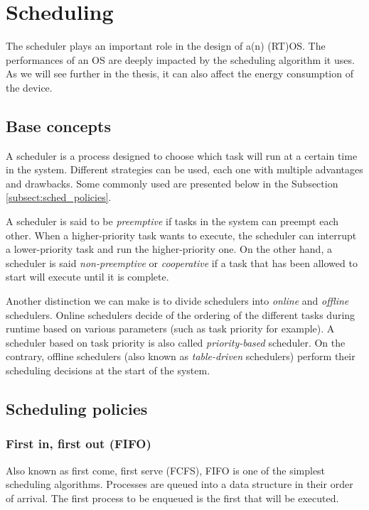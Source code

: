 \section{Scheduling}

The scheduler plays an important role in the design of a(n) (RT)OS.
The performances of an OS are deeply impacted by the scheduling algorithm it uses.
As we will see further in the thesis, it can also affect the energy consumption of the device.\\

\subsection{Base concepts}

A scheduler is a process designed to choose which task will run at a certain time in the system.
Different strategies can be used, each one with multiple advantages and drawbacks.
Some commonly used are presented below in the Subsection \ref{subsect:sched_policies}.

A scheduler is said to be \textit{preemptive} if tasks in the system can preempt each other.
When a higher-priority task wants to execute, the scheduler can interrupt a lower-priority task and run the higher-priority one.
On the other hand, a scheduler is said \textit{non-preemptive} or \textit{cooperative}
    if a task that has been allowed to start will execute until it is complete.

Another distinction we can make is to divide schedulers into \textit{online} and \textit{offline} schedulers.
Online schedulers decide of the ordering of the different tasks during runtime based on various parameters (such as task priority for example).
A scheduler based on task priority is also called \textit{priority-based} scheduler.
On the contrary, offline schedulers (also known as \textit{table-driven} schedulers) perform their scheduling decisions at the start of the system.

\subsection{Scheduling policies\label{subsect:sched_policies}}

\subsubsection{First in, first out (FIFO)}
Also known as first come, first serve (FCFS), FIFO is one of the simplest scheduling algorithms.
Processes are queued into a data structure in their order of arrival.
The first process to be enqueued is the first that will be executed.

